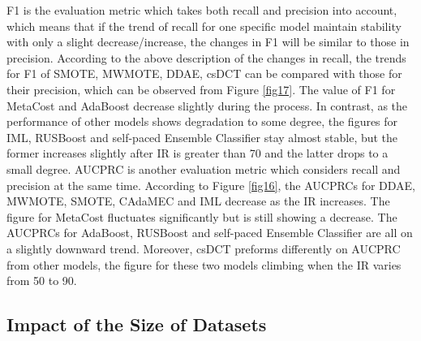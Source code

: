 F1 is the evaluation metric which takes both recall and precision into account, which means that if the trend of recall for one specific model maintain stability with only a slight decrease/increase, the changes in F1 will be similar to those in precision. According to the above description of the changes in recall, the trends for F1 of SMOTE, MWMOTE, DDAE, csDCT can be compared with those for their precision, which can be observed from Figure \ref{fig17}. The value of F1 for MetaCost and AdaBoost decrease slightly during the process. In contrast, as the performance of other models shows degradation to some degree, the figures for IML, RUSBoost and self-paced Ensemble Classifier stay almost stable, but the former increases slightly after IR is greater than 70 and the latter drops to a small degree. AUCPRC is another evaluation metric which considers recall and precision at the same time. According to Figure \ref{fig16}, the AUCPRCs for DDAE, MWMOTE, SMOTE, CAdaMEC and IML decrease as the IR increases. The figure for MetaCost fluctuates significantly but is still showing a decrease. The AUCPRCs for AdaBoost, RUSBoost and self-paced Ensemble Classifier are all on a slightly downward trend. Moreover, csDCT preforms differently on AUCPRC from other models, the figure for these two models climbing when the IR varies from 50 to 90. 

\subsection{Impact of the Size of Datasets}




